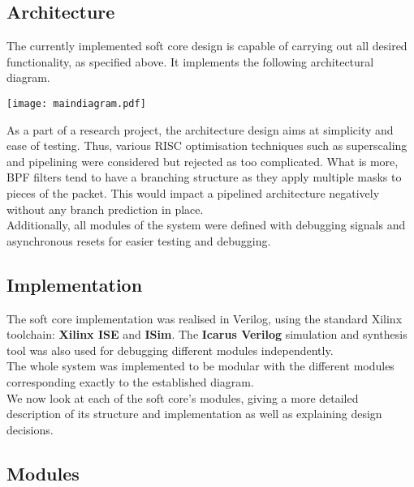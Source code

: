 \documentclass{l4proj}
\begin{document}
\subsection{Architecture}
The currently implemented soft core design is capable of carrying out all desired functionality, as specified above. It implements the following architectural diagram.
\begin{center}
\texttt{[image: maindiagram.pdf]}\\
\end{center}
As a part of a research project, the architecture design aims at simplicity and ease of testing. Thus, various RISC optimisation techniques such as superscaling and pipelining were considered but rejected as too complicated. What is more, BPF filters tend to have a branching structure as they apply multiple masks to pieces of the packet. This would impact a pipelined architecture negatively without any branch prediction in place.\\
Additionally, all modules of the system were defined with debugging signals and asynchronous resets for easier testing and debugging.

\subsection{Implementation}
The soft core implementation was realised in Verilog, using the standard Xilinx toolchain: \textbf{Xilinx ISE} and \textbf{ISim}. The \textbf{Icarus Verilog} simulation and synthesis tool was also used for debugging different modules independently.\\
The whole system was implemented to be modular with the different modules corresponding exactly to the established diagram.\\
We now look at each of the soft core's modules, giving a more detailed description of its structure and implementation as well as explaining design decisions.

\subsection{Modules}
\end{document}
